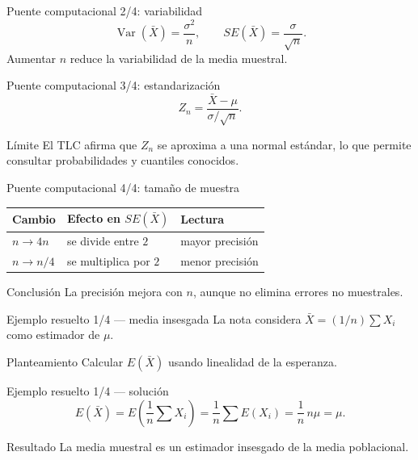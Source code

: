 \documentclass[10pt,aspectratio=169]{beamer}
\begin{document}
\begin{frame}{Puente computacional 2/4: variabilidad}
  \footnotesize
  \[
    \operatorname{Var}(\bar X)=\frac{\sigma^2}{n},
    \qquad SE(\bar X)=\frac{\sigma}{\sqrt n}.
  \]
  Aumentar $n$ reduce la variabilidad de la media muestral.
\end{frame}

\begin{frame}{Puente computacional 3/4: estandarización}
  \footnotesize
  \[
    Z_n=\frac{\bar X-\mu}{\sigma/\sqrt n}.
  \]
  \begin{alertblock}{Límite}
    El TLC afirma que $Z_n$ se aproxima a una normal estándar, lo que permite
    consultar probabilidades y cuantiles conocidos.
  \end{alertblock}
\end{frame}

\begin{frame}{Puente computacional 4/4: tamaño de muestra}
  \footnotesize
  \begin{tabular}{lll}
    \hline
    Cambio & Efecto en $SE(\bar X)$ & Lectura \\
    \hline
    $n\to4n$ & se divide entre $2$ & mayor precisión \\
    $n\to n/4$ & se multiplica por $2$ & menor precisión \\
    \hline
  \end{tabular}
  \begin{block}{Conclusión}
    La precisión mejora con $n$, aunque no elimina errores no muestrales.
  \end{block}
\end{frame}

\begin{frame}{Ejemplo resuelto 1/4 --- media insesgada}
  \footnotesize
  La nota considera $\bar X=(1/n)\sum X_i$ como estimador de $\mu$.
  \begin{block}{Planteamiento}
    Calcular $E(\bar X)$ usando linealidad de la esperanza.
  \end{block}
\end{frame}

\begin{frame}{Ejemplo resuelto 1/4 --- solución}
  \footnotesize
  \[
    E(\bar X)=E\!\left(\frac1n\sum X_i\right)
    =\frac1n\sum E(X_i)=\frac1n\,n\mu=\mu.
  \]
  \begin{alertblock}{Resultado}
    La media muestral es un estimador insesgado de la media poblacional.
  \end{alertblock}
\end{frame}
\end{document}
